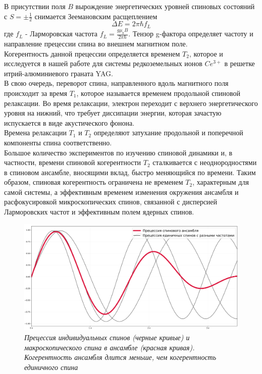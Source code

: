 \documentclass[a4paper,12pt]{article}
\begin{document}
В присутствии поля $B$ вырождение энергетических уровней спиновых состояний с $S = \pm \frac{1}{2}$ снимается Зеемановским расщеплением 
\begin{equation}\label{dE}
\Delta E = 2 \pi \hbar f_L 
\end{equation}
где $f_L$ - Ларморовская частота $f_L = \frac{g \mu_b B}{2 \pi \hbar}$. Тензор g-фактора определяет частоту и направление прецессии спина во внешнем магнитном поле. \\
Когерентность данной прецессии определяется временем $T_2$, которое и исследуется в нашей работе для системы редкоземельных ионов $Ce^{3+}$ в решетке итрий-алюминиевого граната YAG. \\

В свою очередь, переворот спина, направленного вдоль магнитного поля происходит за время $T_1$, которое называется временем продольной спиновой релаксации. Во время релаксации, электрон переходит с верхнего энергетического уровня на нижний, что требует диссипации энергии, которая зачастую испускается в виде акустического фонона. \\
Времена релаксации $T_1$ и $T_2$ определяют затухание продольной и поперечной компоненты спина соответственно. \\

Большое количество экспериментов по изучению спиновой динамики и, в частности, времени спиновой когерентности $T_2$ сталкивается с неоднородностями в спиновом ансамбле, вносящими вклад, быстро меняющийся по времени. Таким образом, спиновая когерентность ограничена не временем $T_2$, характерным для самой системы, а эффективным временем изменения окружения ансамбля и расфокусировкой микроскопических спинов, связанной с дисперсией Ларморовских частот и эффективным полем ядерных спинов.

\begin{figure}[h!]
	\centering
	\includegraphics[scale = 0.17]{inh.png}
	\caption{\textit{Прецессия индивидуальных спинов (черные кривые)
			и макроскопического спина в ансамбле (красная кривая). Когерентность ансамбля длится меньше, чем когерентность единичного спина}}
	\label{fig:inh}
\end{figure}
\end{document}
